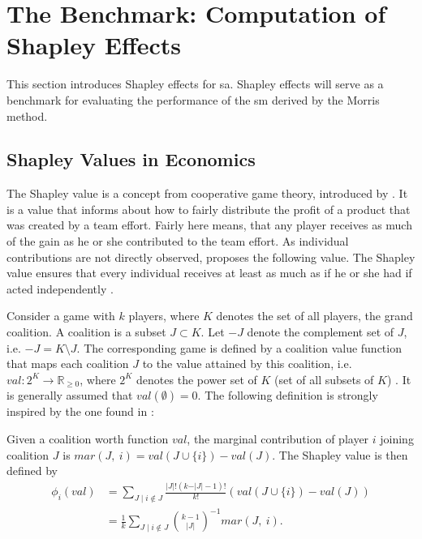 \section{The Benchmark: Computation of Shapley Effects} \label{comp_shap}

This section introduces Shapley effects for sa. Shapley effects will serve as a benchmark for evaluating the performance of the sm derived by the Morris method.

\subsection{Shapley Values in Economics}

The Shapley value is a concept from cooperative game theory, introduced by \citet{S53}. It is a value that informs about how to fairly distribute the profit of a product that was created by a team effort. Fairly here means, that any player receives as much of the gain as he or she contributed to the team effort. As individual contributions are not directly observed, \citet{S53} proposes the following value. The Shapley value ensures that every individual receives at least as much as if he or she had if acted independently \citep{IP19}.

Consider a game with $k$ players, where $K$ denotes the set of all players, the grand coalition. A coalition is a subset $J \subset K$. Let $- J$ denote the complement set of $J$, i.e. $- J = K \setminus{J}$. The corresponding game is defined by a coalition value function that maps each coalition $J$ to the value attained by this coalition, i.e. $val: 2^K \to \mathbb{R}_{\geq 0}$, where $2^K$ denotes the power set of $K$ (set of all subsets of $K$) \citep{SNS16}. It is generally assumed that $val(\emptyset) = 0$. The following definition is strongly inspired by the one found in \citet{PRB20}:

\begin{definition}

Given a coalition worth function $val$, the marginal contribution of player $i$ joining coalition $J$ is $mar(J,\ i)=val(J \cup \{i\}) - val(J)$. The Shapley value is then defined by
\begin{equation}
\begin{split}
\phi_{i} (val)& = \sum_{J \mid i \notin J} \frac{\vert J \vert ! (k - \vert J \vert - 1) ! }{ k !} (val(J \cup \{i\}) - val(J)) \\
& = \frac{1}{k} \sum_{J \mid i \notin J} \binom{k-1}{\vert J \vert}^{-1} mar(J,\ i).
\end{split}
\end{equation}

\end{definition}

